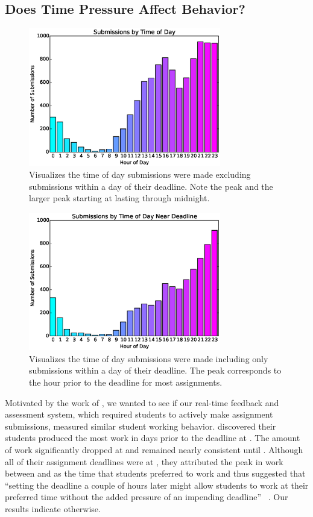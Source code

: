 \subsection{Does Time Pressure Affect Behavior?}

\begin{figure}[!t]
\centering
\includegraphics[width=3.3in]{graphs/Submissions_by_Time_of_Day.eps}
\caption{Visualizes the time of day submissions were made excluding submissions
  within a day of their deadline. Note the  peak and the larger peak
  starting at  lasting through midnight.}
\end{figure}

\begin{figure}[!t]
\centering
\includegraphics[width=3.3in]{graphs/Submissions_by_Time_of_Day_Near_Deadline.eps}
\caption{Visualizes the time of day submissions were made including only
  submissions within a day of their deadline. The  peak corresponds to
  the hour prior to the deadline for most assignments.}
\end{figure}

Motivated by the work of \spacco{}, we wanted to see if our real-time feedback
and assessment system, which required students to actively make assignment
submissions, measured similar student working behavior. \spacco{} discovered
their students produced the most work in days prior to the deadline at
. The amount of work significantly dropped at  and remained nearly
consistent until . Although all of their assignment deadlines were at
, they attributed the peak in work between  and  as the time
that students preferred to work and thus suggested that ``setting the deadline
a couple of hours later might allow students to work at their preferred time
without the added pressure of an impending deadline''
~\cite{Spacco:2013:TIP:2462476.2465594}. Our results indicate otherwise.

